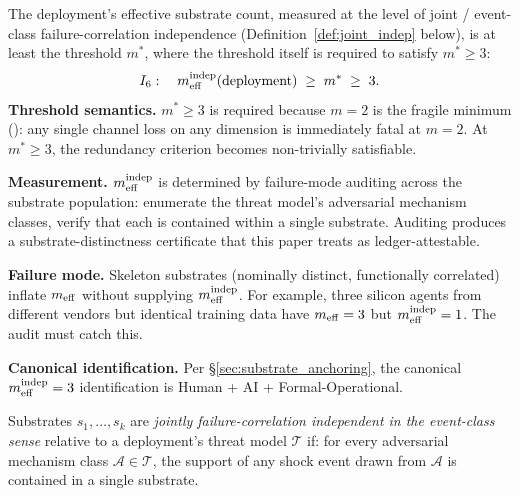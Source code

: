 \begin{definition}
\label{inv:I6}
The deployment's effective substrate count, measured at the level of
joint / event-class failure-correlation independence
(Definition~\ref{def:joint_indep} below), is at least the threshold
$m^*$, where the threshold itself is required to satisfy $m^* \geq 3$:
\[
  I_6: \quad m_{\mathrm{eff}}^{\mathrm{indep}}(\text{deployment}) \;\geq\; m^* \;\geq\; 3.
\]
\textbf{Threshold semantics.} $m^* \geq 3$ is required because $m = 2$ is the
    fragile minimum (\citep[Remark on $m=2$ fragility]{lasser2026phase}): any
    single channel loss on any dimension is immediately fatal at $m = 2$. At
    $m^* \geq 3$, the redundancy criterion becomes non-trivially satisfiable.

\textbf{Measurement.} $m_{\mathrm{eff}}^{\mathrm{indep}}$ is determined by failure-mode auditing across
    the substrate population: enumerate the threat model's adversarial
    mechanism classes, verify that each is contained within a single substrate.
    Auditing produces a substrate-distinctness certificate that this paper
    treats as ledger-attestable.

\textbf{Failure mode.} Skeleton substrates (nominally distinct, functionally
    correlated) inflate $m_{\mathrm{eff}}$ without supplying $m_{\mathrm{eff}}^{\mathrm{indep}}$. For example, three
    silicon agents from different vendors but identical training data have
    $m_{\mathrm{eff}} = 3$ but $m_{\mathrm{eff}}^{\mathrm{indep}} = 1$. The audit must catch this.

\textbf{Canonical identification.} Per \S\ref{sec:substrate_anchoring}, the
    canonical $m_{\mathrm{eff}}^{\mathrm{indep}} = 3$ identification is Human + AI + Formal-Operational.
\end{definition}

\begin{definition}
\label{def:joint_indep}
Substrates $s_1, \ldots, s_k$ are \emph{jointly failure-correlation
independent in the event-class sense} relative to a deployment's
threat model $\mathcal{T}$ if: for every adversarial mechanism class
$\mathcal{A} \in \mathcal{T}$, the support of any shock event drawn
from $\mathcal{A}$ is contained in a single substrate.
\end{definition}

